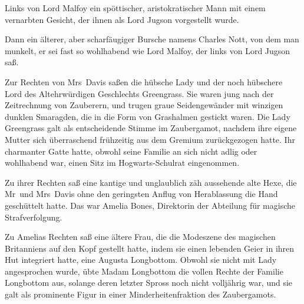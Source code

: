 Links von Lord Malfoy ein spöttischer, aristokratischer Mann mit einem vernarbten Gesicht, der ihnen als Lord Jugson vorgestellt wurde.

Dann ein älterer, aber scharfäugiger Bursche namens Charles Nott, von dem man munkelt, er sei fast so wohlhabend wie Lord Malfoy, der links von Lord Jugson saß.

Zur Rechten von Mrs~Davis saßen die hübsche Lady und der noch hübschere Lord des Altehrwürdigen Geschlechts Greengrass. Sie waren jung nach der Zeitrechnung von Zauberern, und trugen graue Seidengewänder mit winzigen dunklen Smaragden, die in die Form von Grashalmen gestickt waren. Die Lady Greengrass galt als entscheidende Stimme im Zaubergamot, nachdem ihre eigene Mutter sich überraschend frühzeitig aus dem Gremium zurückgezogen hatte. Ihr charmanter Gatte hatte, obwohl seine Familie an sich nicht adlig oder wohlhabend war, einen Sitz im Hogwarts-Schulrat eingenommen.

Zu ihrer Rechten saß eine kantige und unglaublich zäh aussehende alte Hexe, die Mr~und Mrs~Davis ohne den geringsten Anflug von Herablassung die Hand geschüttelt hatte. Das war Amelia Bones, Direktorin der Abteilung für magische Strafverfolgung.

Zu Amelias Rechten saß eine ältere Frau, die die Modeszene des magischen Britanniens auf den Kopf gestellt hatte, indem sie einen lebenden Geier in ihren Hut integriert hatte, eine Augusta Longbottom. Obwohl sie nicht mit Lady angesprochen wurde, übte Madam Longbottom die vollen Rechte der Familie Longbottom aus, solange deren letzter Spross noch nicht volljährig war, und sie galt als prominente Figur in einer Minderheitenfraktion des Zaubergamots.

